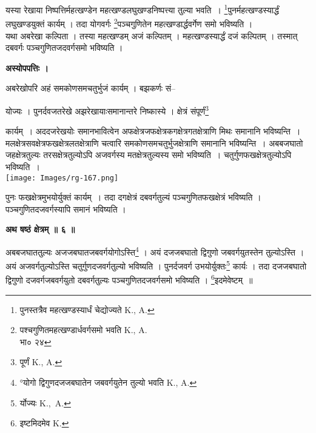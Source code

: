 \documentclass[11pt, openany]{book}
\begin{document}
{\ab यस्या रेखाया निष्पत्तिर्महत्खण्डेन महत्खण्डलघुखण्डनिष्पत्त्या तुल्या भवति~। \renewcommand{\thefootnote}{२}\footnote{पुनस्तत्रैव महत्खण्डस्यार्धं चेद्योज्यते {\en K., A.}}पुनर्महत्खण्डस्यार्द्धं लघुखण्डयुक्तं कार्यम् । तदा योगवर्गः \renewcommand{\thefootnote}{३}\footnote{पश्चगुणितमहत्खण्डार्धवर्गसमो भवति {\en K., A.}\\
 भा० २४}पञ्चगुणितेन महत्खण्डार्द्धवर्गेण समो भविष्यति । }\\

 यथा अबरेखा कल्पिता । तस्या महत्खण्डम् अजं कल्पितम् । महत्खण्डस्यार्द्धं दजं कल्पितम् । तस्मात् दबवर्गः पञ्चगुणितजदवर्गसमो भविष्यति । \\
 \begin{center}
\textbf{अस्योपपत्तिः । }
\end{center}
\vspace{2mm}

अबरेखोपरि अहं समकोणसमचतुर्भुजं कार्यम् । बझकर्णः सं-- 

\newpage
\noindent योज्यः । पुनर्दवजतरेखे अझरेखायाःसमानान्तरे निष्कास्ये । क्षेत्रं संपूर्णं\renewcommand{\thefootnote}{१}\footnote{पूर्णं {\en K., A.}} 
 \begin{vwcol}[widths={0.7,0.3}, sep=.8cm, rule=0pt]
कार्यम्~। अददजरेखयोः समानभावित्वेन अफक्षेत्रजफक्षेत्रकगक्षेत्रगतक्षेत्राणि मिथः समानानि भविष्यन्ति~। मलक्षेत्रसवक्षेत्रफखक्षेत्रलतक्षेत्राणि चत्वारि समकोणसमचतुर्भुजक्षेत्राणि समानानि भविष्यन्ति~। अबबजघातो जहक्षेत्रतुल्यः तरसक्षेत्रतुल्योऽपि अजवर्गस्य
मतक्षेत्रतुल्यस्य समो भविष्यति~। चतुर्गुणफखक्षेत्रतुल्योऽपि भविष्यति~।\\
\noindent \texttt{[image: Images/rg-167.png]}  
\end{vwcol}
\vspace{-4mm}
\noindent पुनः फखक्षेत्रमुभयोर्युक्तं कार्यम्~। तदा दगक्षेत्रं दबवर्गतुल्यं पञ्चगुणितफखक्षेत्रं भविष्यति । पञ्चगुणितदजवर्गस्यापि समानं भविष्यति ।\\
\vspace{3mm}

\begin{center}
\textbf{\large अथ षष्ठं क्षेत्रम् ॥ ६ ॥ }
\end{center}
\vspace{5mm}

{\ab अबबजघाततुल्यः अजजबघातजबवर्गयोगोऽस्ति\renewcommand{\thefootnote}{२}\footnote{°योगो द्विगुणदजजबघातेन जबवर्गयुतेन तुल्यो भवति {\en K., A.}} । अयं दजजबघातो द्विगुणो जबवर्गयुतस्तेन तुल्योऽस्ति । अयं अजवर्गतुल्योऽस्ति चतुर्गुणदजवर्गतुल्यो भविष्यति । पुनर्दजवर्ग उभयोर्युक्तः\renewcommand{\thefootnote}{३}\footnote{र्योज्यः {\en K.,~A.}} कार्यः । तदा दजजबघातो द्विगुणो दजवर्गजबवर्गयुतो दबवर्गतुल्यः पञ्चगुणितदजवर्गसमो भविष्यति । \renewcommand{\thefootnote}{४}\footnote{इष्टमिदमेव {\en K.}}इदमेवेष्टम्~॥} \\
\vspace{5mm}
\end{document}
